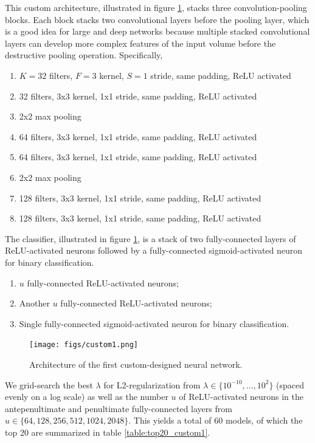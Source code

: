 This custom architecture, illustrated in figure \ref{fig:custom1}, stacks three convolution-pooling blocks. Each block stacks two convolutional layers before the pooling layer, which is a good idea for large and deep networks because multiple stacked convolutional layers can develop more complex features of the input volume before the destructive pooling operation. Specifically,

\begin{enumerate}
    \item $K = 32$ filters, $F = 3$ kernel, $S = 1$ stride, same padding, ReLU activated
    \item 32 filters, 3x3 kernel, 1x1 stride, same padding, ReLU activated
    \item 2x2 max pooling
    \item 64 filters, 3x3 kernel, 1x1 stride, same padding, ReLU activated
    \item 64 filters, 3x3 kernel, 1x1 stride, same padding, ReLU activated
    \item 2x2 max pooling
    \item 128 filters, 3x3 kernel, 1x1 stride, same padding, ReLU activated
    \item 128 filters, 3x3 kernel, 1x1 stride, same padding, ReLU activated
\end{enumerate}

The classifier, illustrated in figure \ref{fig:custom1}, is a stack of two fully-connected layers of ReLU-activated neurons followed by a fully-connected sigmoid-activated neuron for binary classification.

\begin{enumerate}
    \item $u$ fully-connected ReLU-activated neurons;
    \item Another $u$ fully-connected ReLU-activated neurons;
    \item Single fully-connected sigmoid-activated neuron for binary classification.
\end{enumerate}

\begin{figure}[ht]
    \centering
    \texttt{[image: figs/custom1.png]}
    \caption{Architecture of the first custom-designed neural network.}
    \label{fig:custom1}
\end{figure}

We grid-search the best $\lambda$ for L2-regularization from $\lambda \in \{10^{-10}, ..., 10^{2}\}$ (spaced evenly on a log scale) as well as the number $u$ of ReLU-activated neurons in the antepenultimate and penultimate fully-connected layers from $u \in \{ 64, 128, 256, 512, 1024, 2048 \}$. This yields a total of $60$ models, of which the top 20 are summarized in table \ref{table:top20_custom1}.

